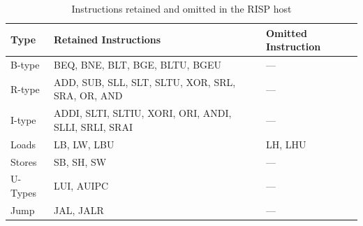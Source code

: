 \begin{table}[h!]
    \centering
    \caption{Instructions retained and omitted in the RISP host}
    \label{tab:instruction_types}
    \begin{tabularx}{0.5\textwidth}{l X X}
        \toprule
        \textbf{Type} & \textbf{Retained Instructions} & \textbf{Omitted Instruction}\\
        \midrule
        B-type & BEQ, BNE, BLT, BGE, BLTU, BGEU & --- \\
        R-type & ADD, SUB, SLL, SLT, SLTU, XOR, SRL, SRA, OR, AND & --- \\
        I-type & ADDI, SLTI, SLTIU, XORI, ORI, ANDI, SLLI, SRLI, SRAI & --- \\
        Loads & LB, LW, LBU & LH, LHU \\
        Stores & SB, SH, SW & --- \\
        U-Types & LUI, AUIPC & --- \\
        Jump & JAL, JALR & --- \\
        \bottomrule
    \end{tabularx}
\end{table}
